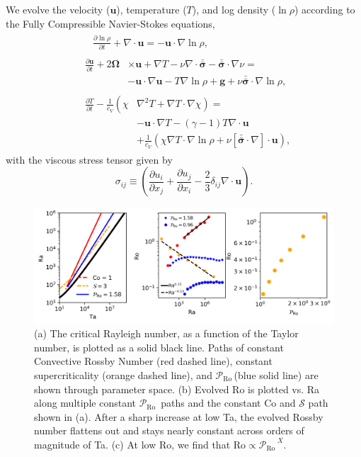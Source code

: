 \documentclass[twocolumn, amsmath, amsfonts, amssymb]{aastex62}
\newcommand{\grad}{\ensuremath{\nabla}}
\newcommand{\lilstressT}{\ensuremath{\bm{\bar{\bar{\sigma}}}}}
\newcommand{\pro}{\ensuremath{\mathcal{P}_{\text{Ro}}\,}}
\begin{document}
We evolve the velocity ($\bm{u}$), temperature ($T$), and log density ($\ln\rho$) according to the
Fully Compressible Navier-Stokes equations,
\begin{align}
&\begin{aligned}
&\frac{\partial \ln\rho}{\partial t} + \grad\cdot\bm{u} 
    = -\bm{u}\cdot\grad\ln\rho,
	\label{eqn:continuity_eqn}
\end{aligned}\\
&\begin{aligned}
\frac{\partial\bm{u}}{\partial t} + 2\bm{\Omega}&\times\bm{u} + \grad T - 
\nu\grad\cdot\lilstressT - \lilstressT\cdot\grad\nu = \\
&-\bm{u}\cdot\grad\bm{u} - T\grad\ln\rho + \bm{g} + 
\nu\lilstressT\cdot\grad\ln\rho,
\label{eqn:momentum_eqn}
\end{aligned}\\
&\begin{aligned}
\frac{\partial T}{\partial t} -\frac{1}{c_V}\left(\right.\chi&\left.
    \grad^2 T + \grad T\cdot\grad\chi\right) = \\
	&-\bm{u}\cdot\grad T - (\gamma-1)T\grad\cdot{\bm{u}} \\
	&+ \frac{1}{c_V}\left(\chi\grad T \cdot\grad\ln\rho +
	\nu\left[\lilstressT\cdot\nabla\right]\cdot\bm{u}\right), 
	\label{eqn:energy_eqn}
\end{aligned}
\end{align}
with the viscous stress tensor given by
\begin{equation}
\sigma_{ij} \equiv \left(\frac{\partial u_i}{\partial x_j} + 
\frac{\partial u_j}{\partial x_i} - \frac{2}{3}\delta_{ij}\grad\cdot\bm{u}\right).
	\label{eqn:stress_tensor}
\end{equation}


\begin{figure}[t!]
\includegraphics[width=\textwidth]{./figs/parameter_space.png}
\caption{(a) The critical Rayleigh number, as a function of the Taylor number, 
is plotted as a solid black line. Paths of constant Convective Rossby Number
(red dashed line), constant supercriticality (orange dashed line), and 
\pro (blue solid line) are shown through parameter space. (b) Evolved
Ro is plotted vs. Ra along multiple constant \pro
paths and the constant Co and $\mathcal{S}$ path shown in (a).
After a sharp increase at low Ta, the evolved Rossby number flattens
out and stays nearly constant across orders of magnitude of Ta.
(c) At low Ro, we find that $\text{Ro} \propto \pro^X$.
\label{fig:parameter_space} }
\end{figure}
\end{document}

